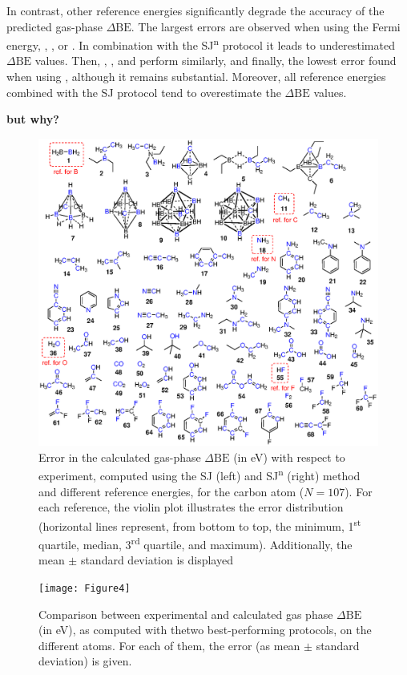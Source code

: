 \documentclass[journal=jpccck,manuscript=article]{achemso}
\def\dbe{\ensuremath{\Delta\text{BE}}}
\begin{document}
In contrast, other reference energies significantly degrade the accuracy of the predicted gas-phase \dbe{}. The largest errors are observed when using the Fermi energy, , , or . In combination with the SJ\textsuperscript{n} protocol it leads to underestimated \dbe{} values. Then, , , and  perform similarly, and finally, the lowest error found when using \cp{\phi}, although it remains substantial. Moreover, all reference energies combined with the SJ protocol tend to overestimate the \dbe{} values.

\textbf{but why?}


\begin{figure}[!h]
	\centering
	\includegraphics[width=\linewidth]{Figure3}
	\caption{Error in the calculated gas-phase \dbe{}  (in \si{\electronvolt}) with respect to experiment, computed using the SJ (left) and SJ\textsuperscript{n} (right) method and different reference energies, for the carbon atom ($N=107$). For each reference, the violin plot illustrates the error distribution (horizontal lines represent, from bottom to top, the minimum, 1\textsuperscript{st} quartile, median, 3\textsuperscript{rd} quartile, and maximum). Additionally, the mean $\pm$ standard deviation is displayed}
	\label{fig:xps_C185_C}
\end{figure}


\begin{figure}[!h]
	\centering
	\texttt{[image: Figure4]}
	\caption{Comparison between experimental and calculated gas phase \dbe{} (in \si{\electronvolt}), as computed with thetwo best-performing protocols, on the different atoms. For each of them, the error (as mean $\pm$ standard deviation) is given.}
	\label{fig:xps_C185}
\end{figure}
\end{document}
